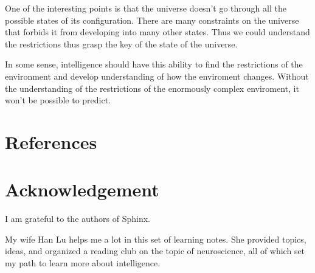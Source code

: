 \documentclass[letterpaper,10pt,english]{sphinxmanual}
\begin{document}
One of the interesting points is that the universe doesn’t go through all the possible states of its configuration. There are many constraints on the universe that forbids it from developing into many other states. Thus we could understand the restrictions thus grasp the key of the state of the universe.

In some sense, intelligence should have this ability to find the restrictions of the environment and develop understanding of how the enviroment changes. Without the understanding of the restrictions of the enormously complex enviroment, it won’t be possible to predict.


\chapter{References}
\label{\detokenize{ref:references}}\label{\detokenize{ref::doc}}

\chapter{Acknowledgement}
\label{\detokenize{acknowledgement::doc}}\label{\detokenize{acknowledgement:acknowledgement}}
I am grateful to the authors of Sphinx.

My wife Han Lu helps me a lot in this set of learning notes. She provided topics, ideas, and organized a reading club on the topic of neuroscience, all of which set my path to learn more about intelligence.
\end{document}

